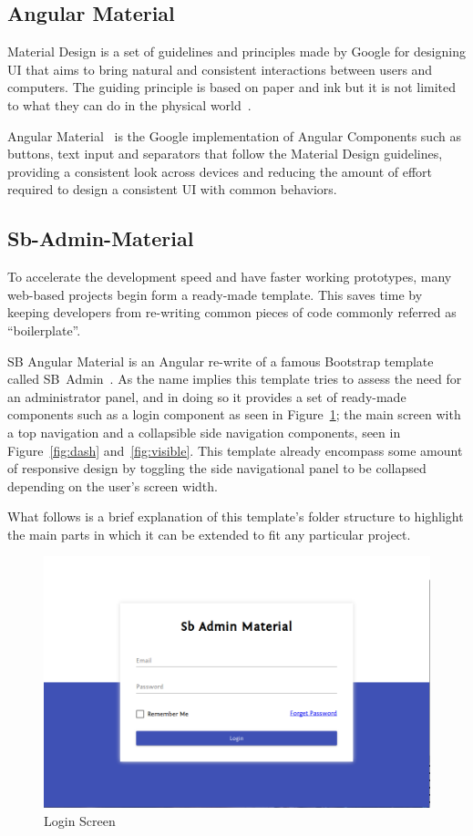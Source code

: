 \subsection{Angular Material}
Material Design is a set of guidelines and principles made by Google for designing \gls{UI} that aims to bring natural and consistent interactions between users and computers. The guiding principle is based on paper and ink but it is not limited to what they can do in the physical world~\cite{materialdesign}.

Angular Material~\cite{angularmaterial} is the Google implementation of Angular Components such as buttons, text input and separators that follow the Material Design guidelines, providing a consistent look across devices and reducing the amount of effort required to design a consistent \gls{UI} with common behaviors.

\subsection{Sb-Admin-Material}\label{template}
To accelerate the development speed and have faster working prototypes, many web-based projects begin form a ready-made template. This saves time by keeping developers from re-writing common pieces of code commonly referred as ``boilerplate''.

SB Angular Material is an Angular re-write of a famous Bootstrap template called SB~Admin~\cite{angulartemplate}.
As the name implies this template tries to assess the need for an administrator panel, and in doing so it provides a set of ready-made components such as a login component as seen in Figure~\ref{fig:login}; the main screen with a top navigation and a collapsible side navigation components, seen in Figure~\ref{fig:dash} and~\ref{fig:visible}. This template already encompass some amount of responsive design by toggling the side navigational panel to be collapsed depending on the user's screen width.

What follows is a brief explanation of this template's folder structure to highlight the main parts in which it can be extended to fit any particular project.

\begin{figure}
  \centering
  \includegraphics[width=.8\textwidth]{images/sbadmin/login}
  \caption{Login Screen}\label{fig:login}
\end{figure}

